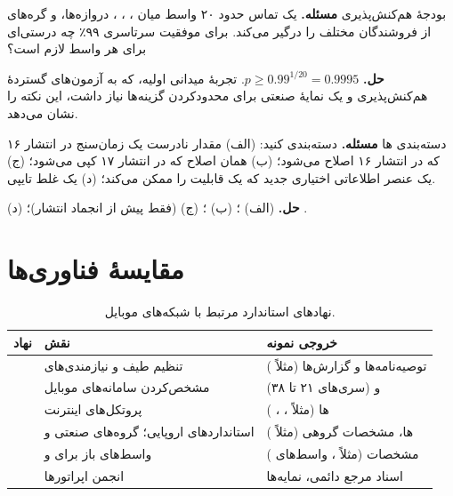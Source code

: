 \documentclass[11pt,a4paper]{article}
\begin{document}
\begin{examplebox}{بودجهٔ هم‌کنش‌پذیری}\label{ex:interop}
\textbf{مسئله.} یک تماس  حدود ۲۰ واسط میان ، ، ، دروازه‌ها،  و گره‌های
 از فروشندگان مختلف را درگیر می‌کند. برای موفقیت سرتاسری ۹۹٪ چه درستی‌ای برای هر واسط لازم است؟

\textbf{حل.} $p \ge 0.99^{1/20} = 0.9995$. تجربهٔ میدانی  اولیه، که به آزمون‌های گستردهٔ هم‌کنش‌پذیری و یک نمایهٔ
صنعتی برای محدودکردن گزینه‌ها نیاز داشت، این نکته را نشان می‌دهد.
\end{examplebox}

\begin{examplebox}{دسته‌بندی ها}\label{ex:cr}
\textbf{مسئله.} دسته‌بندی کنید: (الف) مقدار نادرست یک زمان‌سنج در انتشار ۱۶ که در انتشار ۱۶ اصلاح می‌شود؛ (ب) همان اصلاح که
در انتشار ۱۷ کپی می‌شود؛ (ج) یک عنصر اطلاعاتی اختیاری جدید که یک قابلیت را ممکن می‌کند؛ (د) یک غلط تایپی.

\textbf{حل.} (الف) ؛ (ب) ؛ (ج)  (فقط پیش از انجماد انتشار)؛ (د) .
\end{examplebox}

\section{مقایسهٔ فناوری‌ها}
\begin{table}[htbp]
\centering\small
\caption{نهادهای استاندارد مرتبط با شبکه‌های موبایل.}\label{tab:bodies}
\begin{tabularx}{\linewidth}{@{}l Y Y@{}}
\toprule
{}نهاد & نقش & خروجی نمونه \\
\midrule
{}  & تنظیم طیف و نیازمندی‌های             & توصیه‌نامه‌ها و گزارش‌ها (مثلاً ) \\
 & مشخص‌کردن سامانه‌های موبایل                     &  و  (سری‌های ۲۱ تا ۳۸) \\
 & پروتکل‌های اینترنت                              & ها (مثلاً ، ، ) \\
 & استانداردهای اروپایی؛ گروه‌های صنعتی  و  & ها، مشخصات گروهی (مثلاً ) \\
 & واسط‌های باز برای  و  & مشخصات (مثلاً ، واسط‌های ) \\
 & انجمن اپراتورها                                 & اسناد مرجع دائمی، نمایه‌ها \\
\bottomrule
\end{tabularx}
\end{table}
\end{document}
